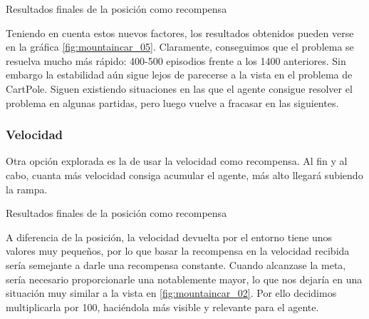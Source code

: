 %
       {Resultados finales de la posición como recompensa}

Teniendo en cuenta estos nuevos factores, los resultados obtenidos pueden verse en la gráfica \ref{fig:mountaincar_05}. Claramente, conseguimos que el problema se resuelva mucho más rápido: 400-500 episodios frente a los 1400 anteriores.  Sin embargo la estabilidad aún sigue lejos de parecerse a la vista en el problema de CartPole. Siguen existiendo situaciones en las que el agente consigue resolver el problema en algunas partidas, pero luego vuelve a fracasar en las siguientes.




\subsubsection*{Velocidad}

Otra opción explorada es la de usar la velocidad como recompensa. Al fin y al cabo, cuanta más velocidad consiga acumular el agente, más alto llegará subiendo la rampa.

%
       {Resultados finales de la posición como recompensa}

A diferencia de la posición, la velocidad devuelta por el entorno tiene unos valores muy pequeños, por lo que basar la recompensa en la velocidad recibida sería semejante a darle una recompensa constante. Cuando alcanzase la meta, sería necesario proporcionarle una notablemente mayor, lo que nos dejaría en una situación muy similar a la vista en \ref{fig:mountaincar_02}. Por ello decidimos multiplicarla por 100, haciéndola más visible y relevante para el agente. 

